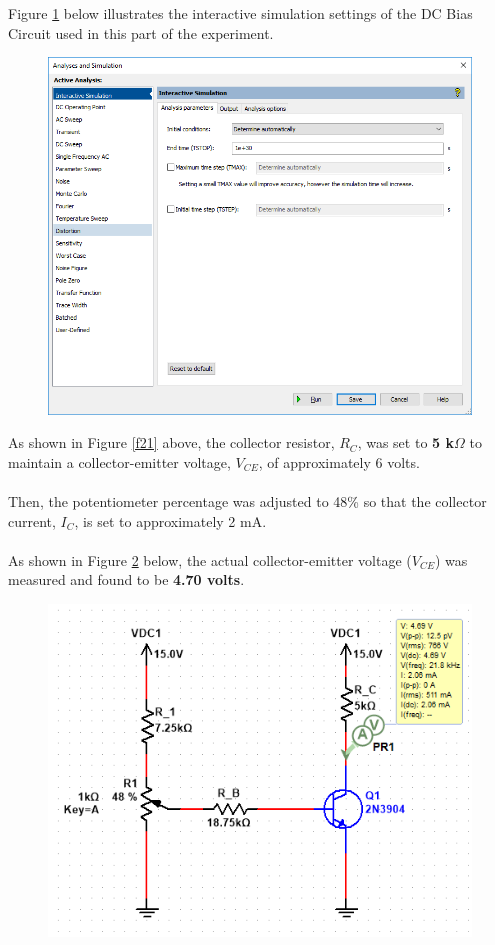 \documentclass{article}
\begin{document}
	\pagebreak
	
	\noindent Figure \ref{f22} below illustrates the interactive simulation settings of the DC Bias Circuit used in this part of the experiment.
	\begin{figure}[!ht]
		\centering
		\includegraphics[width=0.55\linewidth]{part4-DcOperatingSweep.png}
		\label{f22}
	\end{figure}
	
	\noindent As shown in Figure \ref{f21} above, the collector resistor, $R_C$, was set to \textbf{5 k$\Omega$} to maintain a collector-emitter voltage, $V_{CE}$, of approximately 6 volts.\\\\
	Then, the potentiometer percentage was adjusted to 48\% so that the collector current, $I_C$, is set to approximately 2 mA.\\\\
	As shown in Figure \ref{f23} below, the actual collector-emitter voltage ($V_{CE}$) was measured and found to be \textbf{4.70 volts}.
	\begin{figure}[!ht]
		\centering
		\includegraphics[width=0.6\linewidth]{part4-a2}
		\label{f23}
	\end{figure}
\end{document}

